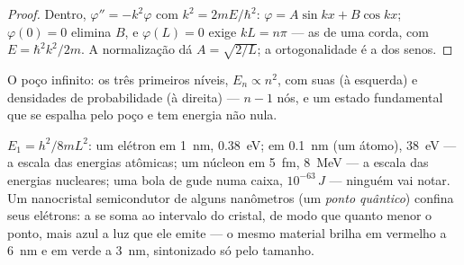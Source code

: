 \begin{proof}
Dentro, $\varphi'' = -k^2\varphi$ com $k^2 = 2mE/\hbar^2$: $\varphi = A\sin kx
+ B\cos kx$; $\varphi(0) = 0$ elimina $B$, e $\varphi(L) = 0$ exige $kL = n\pi$
--- as  de uma corda, com $E = \hbar^2k^2/2m$.
A normalização dá $A = \sqrt{2/L}$; a ortogonalidade é a dos
senos.
\end{proof}

\begin{omfigure}

{\small O poço infinito: os três primeiros níveis, $E_n \propto n^2$,
com suas  (à esquerda) e densidades de probabilidade (à direita) ---
$n - 1$ nós, e um estado fundamental que se espalha pelo poço e
tem energia não nula.}
\end{omfigure}

\begin{example}\label{ex:b2:potential-wells-tunneling:orders}
$E_1 = h^2/8mL^2$: um elétron em \qty{1}{nm}, \qty{0.38}{eV}; em
\qty{0.1}{nm} (um átomo), \qty{38}{eV} --- a escala das energias atômicas; um
núcleon em \qty{5}{fm}, \qty{8}{MeV} --- a escala das energias nucleares; uma
bola de gude numa caixa, $10^{-63}\,\unit{J}$ --- ninguém vai notar. Um
nanocristal semicondutor de alguns nanômetros (um \emph{ponto
quântico}) confina seus elétrons: a  se soma ao
intervalo do cristal, de modo que quanto menor o ponto, mais azul a luz que ele emite ---
o mesmo material brilha em vermelho a \qty{6}{nm} e em verde a \qty{3}{nm},
sintonizado só pelo tamanho.
\end{example}

